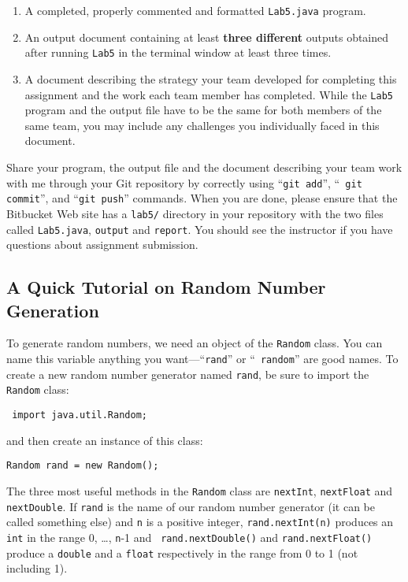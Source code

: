\begin{enumerate}
	\item A completed, properly commented and formatted {\tt Lab5.java} program.

        \item An output document containing at least \textbf{three different} outputs obtained after running {\tt Lab5} in the terminal window at least three times. 
        
        \item A document describing the strategy your team developed for completing this assignment and the work each team member has completed. While the {\tt Lab5} program and the output file have to be the same for both members of the same team, you may include any challenges you individually faced in this document.
\end{enumerate}

\vspace{-0.1in}
Share your program, the output file and the document describing your team work with me through your Git repository by correctly using ``{\tt git add}'', ``{\tt
git commit}'', and ``{\tt git push}'' commands. When you are done, please ensure that the Bitbucket Web site has
a {\tt lab5/} directory in your repository with the two files called {\tt Lab5.java}, {\tt output} and {\tt report}. You should see 
the instructor if you have questions about assignment submission.

\vspace{-0.05in}
\subsection*{A Quick Tutorial on Random Number Generation} 
\vspace{-0.05in}
To generate random numbers, we need an object of the {\tt Random} class.
You can name this variable anything you want---``{\tt rand}'' or ``{\tt
random}'' are good names. To create a new random number generator
named {\tt rand}, be sure to import the {\tt Random} class:
\begin{center}
\verb$ import java.util.Random;$
\end{center}
and then create an instance of this class:
\begin{center}
\verb$Random rand = new Random();$
\end{center}

The three most useful methods in the {\tt Random} class are {\tt nextInt}, {\tt nextFloat} and {\tt nextDouble}. If {\tt rand} is the name of our random number
generator (it can be called something else) and {\tt n} is a positive integer, {\tt rand.nextInt(n)}
produces an {\tt int} in the range 0, \ldots, {\tt n}-1 and {\tt
rand.nextDouble()} and {\tt rand.nextFloat()} produce a {\tt double} and a {\tt float} respectively in the range from 0 to 1 (not
including 1). 

